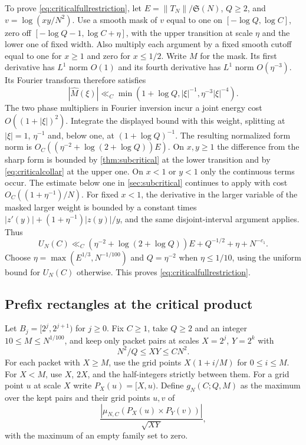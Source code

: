 \documentclass[11pt,a4paper]{article}
\numberwithin{equation}{section}
\newcommand{\SSS}{\mathfrak S}
\begin{document}
To prove \cref{eq:criticalfullrestriction}, let
$E=\|T_N\|/\SSS(N)$, $Q\ge2$, and
$v=\log(xy/N^2)$. Use a smooth mask of $v$ equal to one on
$[-\log Q,\log C]$, zero off $[-\log Q-1,\log C+\eta]$,
with the upper transition at scale $\eta$ and the lower
one of fixed width. Also multiply each argument by a
fixed smooth cutoff equal to one for $x\ge1$ and zero
for $x\le1/2$. Write $M$ for the mask. Its first derivative
has $L^1$ norm $O(1)$ and its fourth derivative has $L^1$
norm $O(\eta^{-3})$. Its Fourier transform therefore
satisfies
\[
 |\widehat M(\xi)|\ll_C
      \min(1+\log Q,|\xi|^{-1},\eta^{-3}|\xi|^{-4}).
\]
The two phase multipliers in Fourier inversion incur a joint
energy cost $O((1+|\xi|)^2)$. Integrate the displayed bound
with this weight, splitting at $|\xi|=1$, $\eta^{-1}$ and,
below one, at $(1+\log Q)^{-1}$. The resulting normalized
form norm is $O_C((\eta^{-2}+\log(2+\log Q))E)$.
On $x,y\ge1$ the difference from the sharp form is
bounded by \cref{thm:subcritical} at the lower transition
and by \cref{eq:criticalcollar} at the upper one.
On $x<1$ or $y<1$ only the continuous terms occur.
The estimate below one in \cref{sec:subcritical} continues
to apply with cost $O_C((1+\eta^{-1})/N)$.
For fixed $x<1$, the derivative in the larger variable
of the masked larger weight is bounded by a constant
times $|z'(y)|+(1+\eta^{-1})|z(y)|/y$, and the same
disjoint-interval argument applies. Thus
\[
 U_N(C)\ll_C (\eta^{-2}+\log(2+\log Q))E
       +Q^{-1/2}+\eta+N^{-c_1}.
\]
Choose $\eta=\max(E^{1/3},N^{-1/100})$ and $Q=\eta^{-2}$
when $\eta\le1/10$, using the uniform bound for $U_N(C)$
otherwise. This proves \cref{eq:criticalfullrestriction}.

\subsection{Prefix rectangles at the critical product}
\label{sec:criticalgrid}

Let $B_j=[2^j,2^{j+1})$ for $j\ge0$. Fix $C\ge1$, take
$Q\ge2$ and an integer $10\le M\le N^{1/100}$, and keep
only packet pairs at scales $X=2^j$, $Y=2^k$ with
\begin{equation}
       N^2/Q\le XY\le CN^2 .
 \label{eq:criticalgridband}
\end{equation}
For each packet with $X\ge M$, use the grid points
$X(1+i/M)$ for $0\le i\le M$. For $X<M$, use $X$, $2X$,
and the half-integers strictly between them. For a grid
point $u$ at scale $X$ write $P_X(u)=[X,u)$.
Define $g_N(C;Q,M)$ as the maximum over the kept pairs
and their grid points $u,v$ of
\[
   \frac{|\mu_{N,C}(P_X(u)\times P_Y(v))|}{\sqrt{XY}},
\]
with the maximum of an empty family set to zero.
\end{document}
